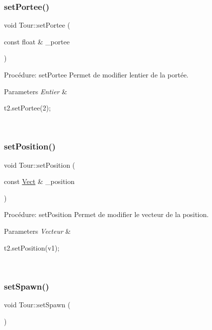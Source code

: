 \subsubsection{\texorpdfstring{set\+Portee()}{setPortee()}}
{\footnotesize\ttfamily void Tour\+::set\+Portee (\begin{DoxyParamCaption}\item[{const float \&}]{\+\_\+portee }\end{DoxyParamCaption})}



Procédure\+: set\+Portee Permet de modifier l\textquotesingle{}entier de la portée. 


\begin{DoxyParams}{Parameters}
{\em Entier} & 
\begin{DoxyCode}
t2.setPortee(2);
\end{DoxyCode}
 \\
\hline
\end{DoxyParams}
\mbox{\label{classTour_a1db07b7ed15a7b0d11e96bb67831feba}} 
\subsubsection{\texorpdfstring{set\+Position()}{setPosition()}}
{\footnotesize\ttfamily void Tour\+::set\+Position (\begin{DoxyParamCaption}\item[{const \hyperlink{classVect}{Vect} \&}]{\+\_\+position }\end{DoxyParamCaption})}



Procédure\+: set\+Position Permet de modifier le vecteur de la position. 


\begin{DoxyParams}{Parameters}
{\em Vecteur} & 
\begin{DoxyCode}
t2.setPosition(v1);
\end{DoxyCode}
 \\
\hline
\end{DoxyParams}
\mbox{\label{classTour_ae14b537e1e6fcfef00eadfd0d6d29e46}} 
\subsubsection{\texorpdfstring{set\+Spawn()}{setSpawn()}\hspace{0.1cm}{\footnotesize\ttfamily [1/2]}}
{\footnotesize\ttfamily void Tour\+::set\+Spawn (\begin{DoxyParamCaption}{ }\end{DoxyParamCaption})}



